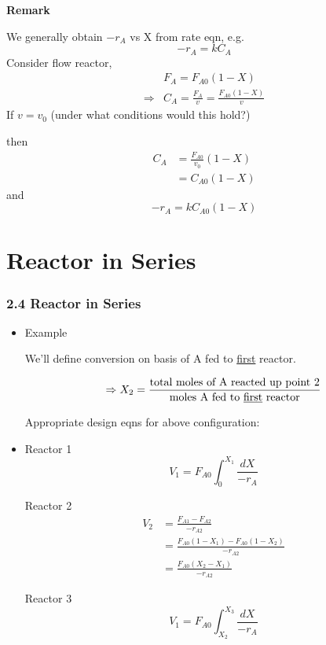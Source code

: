 \begin{frame}
	\textbf{Remark}

	We generally obtain $-r_A$ vs X from rate eqn, e.g. $$-r_A = kC_A$$ Consider flow reactor,
	\begin{align*}
		&F_A = F_{A0}(1 - X)\\
		\Rightarrow&C_A = \frac{F_A}{v} = \frac{F_{A0}(1 - X)}{v}
	\end{align*}
	If $v = v_0$ {\color{red}(under what conditions would this hold?)}

	then
	\begin{align*}
		C_A &= \frac{F_{A0}}{v_0}(1 - X)\\
		&= C_{A0}(1 - X)
	\end{align*}
	and $$-r_A = kC_{A0}(1 - X)$$
\end{frame}

\section{Reactor in Series}
\begin{frame}\frametitle{2.4 \color{blue}Reactor in Series}
	\begin{itemize}
		\item	Example

		We'll define conversion on basis of A fed to {\color{red}\underline{first}} reactor.

		$$\Rightarrow X_2 = \frac{\text{total moles of A reacted up point 2}}{\text{moles A fed to \underline{first} reactor}}$$

		Appropriate design eqns for above configuration:
	\end{itemize}
\end{frame}
\begin{frame}
	\begin{itemize}
		\item	{\color{red}Reactor 1} $$V_1 = F_{A0}\int_0^{X_1}\frac{dX}{-r_A}$$

		{\color{red}Reactor 2}
		\begin{align*}
			V_2 &= \frac{F_{A1} - F_{A2}}{-r_{A2}}\\
			&= \frac{F_{A0}(1 - X_1) - F_{A0}(1 - X_2)}{-r_{A2}}\\
			&= \frac{F_{A0}(X_2 - X_1)}{-r_{A2}}
		\end{align*}

		{\color{red}Reactor 3} $$V_1 = F_{A0}\int_{X_2}^{X_3}\frac{dX}{-r_A}$$
	\end{itemize}
\end{frame}

